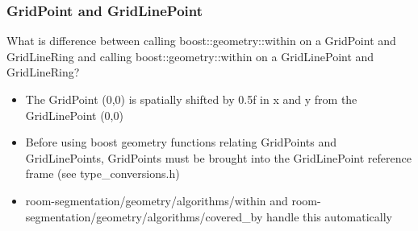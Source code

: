 \documentclass{beamer}
\begin{document}
\begin{frame}
\begin{figure}
{
        }
    \end{figure}
\end{frame}

\begin{frame}
    \frametitle{GridPoint and GridLinePoint}
    What is difference between calling boost::geometry::within on a GridPoint and GridLineRing and calling boost::geometry::within on a GridLinePoint and GridLineRing?
    \begin{itemize}
        \item The GridPoint (0,0) is spatially shifted by 0.5f in x and y from the GridLinePoint (0,0)
        \item Before using boost geometry functions relating GridPoints and GridLinePoints, GridPoints must be brought into the GridLinePoint reference frame (see type\_conversions.h)
        \item room-segmentation/geometry/algorithms/within and room-segmentation/geometry/algorithms/covered\_by handle this automatically
    \end{itemize}
\end{frame}
\end{document}
